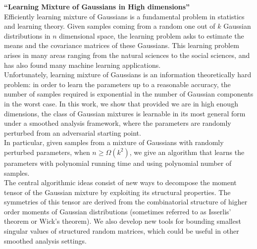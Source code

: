 \documentclass[margin,line,11pt]{resume}
\begin{document}
\begin{resume}
\textbf{``Learning Mixture of Gaussians in High dimensions''}
\\
  Efficiently learning mixture of Gaussians is a fundamental problem in statistics and
  learning theory.  Given samples coming from a random one out of $k$ Gaussian
  distributions in $n$ dimensional space, the learning problem asks to estimate the means and the
  covariance matrices of these Gaussians.  This learning problem arises in many areas
  ranging from the natural sciences to the social sciences, and has also found many
  machine learning applications.
\\
  Unfortunately,  learning mixture of Gaussians is an information theoretically
  hard problem: in order to learn the parameters up to a reasonable accuracy, the number of samples
  required is exponential in the number of Gaussian components in the worst case.
  In this work, we show that provided we are in high enough dimensions, the class of Gaussian
  mixtures is learnable in its most general form under a smoothed analysis framework, where the
  parameters are randomly perturbed from an adversarial starting point.
\\
  In particular, given samples from a mixture of Gaussians with randomly perturbed
  parameters, when $n\ge \Omega(k^2)$, we give an algorithm that learns the parameters
  with polynomial running time and using polynomial number of samples.
  \\
  The central algorithmic ideas consist of new ways to decompose the  moment tensor of
  the Gaussian mixture by exploiting its structural properties.
%
  The symmetries of this tensor are derived from the combinatorial structure of higher
  order moments of Gaussian distributions (sometimes referred to as Isserlis' theorem or
  Wick's theorem).
  We also develop new tools for bounding smallest singular values of structured random
  matrices, which could be useful in other smoothed analysis settings.




\end{resume}
\end{document}
